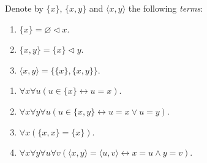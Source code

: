 \begin{definition}
    \label{def:singleton+pair}
    \leanok
    Denote by $\{x\}$, $\{x,y\}$ and $\langle x,y\rangle$ the following \textit{terms}:
    \begin{enumerate}
        \item $\{x\} = \varnothing \lhd x$.
        \item $\{x,y\} = \{x\} \lhd y$.
        \item $\langle x,y\rangle = \{\{x\}, \{x,y\}\}$.
    \end{enumerate}
\end{definition}

\begin{lemma}
    \label{lem:mem_singleton+...+pair_inj}
    \leanok
    \leavevmode
    \begin{enumerate}
        \item $\forall x \forall u (u\in \{x\} \leftrightarrow u = x)$.
        \item $\forall x \forall y \forall u (u \in \{x,y\}\leftrightarrow u=x \lor u=y)$.
        \item $\forall x (\{x,x\} = \{x\})$.
        \item $\forall x \forall y \forall u \forall v 
        (\langle x,y\rangle = \langle u,v\rangle \leftrightarrow x=u \land y=v)$.
    \end{enumerate}
\end{lemma}

